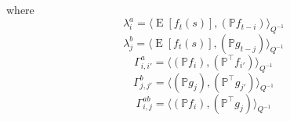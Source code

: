 \documentclass{IEEEtran}
\newcommand{\inner}[3]{\langle#1,#2\rangle_{#3}}
\DeclareMathOperator{\E}{E}
\begin{document}
where
\begin{equation}
	\lambda_i^a = \inner
	{\E[f_t(s)]}
	{(\mathbb{P} f_{t-i})}
	{Q^{-1}}
\end{equation}
\begin{equation}
	\lambda_j^b = \inner
	{\E[f_t(s)]}
	{(\mathbb{P} g_{t-j})}
	{Q^{-1}}
\end{equation}
\begin{equation}
	 \Gamma_{i,i'}^a = \inner
		{(\mathbb{P} f_{i})}
		{(\mathbb{P}^\top f_{i'})}
		{Q^{-1}}
\end{equation}
\begin{equation}
	\Gamma_{j,j'}^b = \inner
		{(\mathbb{P} g_{j})}
		{(\mathbb{P}^\top g_{j'})}
		{Q^{-1}}
\end{equation}
\begin{equation}
	\Gamma_{i,j}^{ab} = \inner
		{(\mathbb{P} f_{i})}
		{(\mathbb{P}^\top g_{j})}
		{Q^{-1}}
\end{equation}
\end{document}
